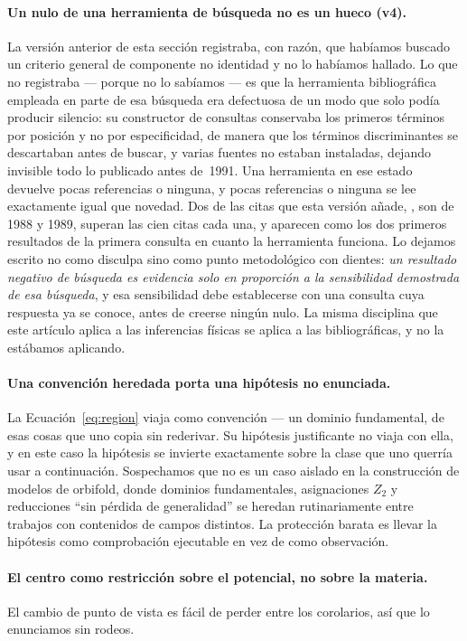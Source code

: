 \documentclass[11pt,a4paper]{article}
\begin{document}
\paragraph{Un nulo de una herramienta de búsqueda no es un hueco (v4).} La versión anterior de
esta sección registraba, con razón, que habíamos buscado un criterio general de componente
no identidad y no lo habíamos hallado. Lo que no registraba --- porque no lo sabíamos --- es que la
herramienta bibliográfica empleada en parte de esa búsqueda era defectuosa de un modo que solo
podía producir silencio: su constructor de consultas conservaba los primeros términos por
posición y no por especificidad, de manera que los términos discriminantes se descartaban antes
de buscar, y varias fuentes no estaban instaladas, dejando invisible todo lo publicado antes
de~1991. Una herramienta en ese estado devuelve pocas referencias o ninguna, y pocas referencias
o ninguna se lee exactamente igual que novedad. Dos de las citas que esta versión añade,
\cite{DaviesMcLachlan1,DaviesMcLachlan2}, son de 1988 y 1989, superan las cien citas cada una, y
aparecen como los dos primeros resultados de la primera consulta en cuanto la herramienta
funciona. Lo dejamos escrito no como disculpa sino como punto metodológico con dientes:
\emph{un resultado negativo de búsqueda es evidencia solo en proporción a la sensibilidad
demostrada de esa búsqueda}, y esa sensibilidad debe establecerse con una consulta cuya
respuesta ya se conoce, antes de creerse ningún nulo. La misma disciplina que este artículo
aplica a las inferencias físicas se aplica a las bibliográficas, y no la estábamos aplicando.

\paragraph{Una convención heredada porta una hipótesis no enunciada.} La
Ecuación~\eqref{eq:region} viaja como convención --- un dominio fundamental, de esas cosas que
uno copia sin rederivar. Su hipótesis justificante no viaja con ella, y en este caso la
hipótesis se invierte exactamente sobre la clase que uno querría usar a continuación.
Sospechamos que no es un caso aislado en la construcción de modelos de orbifold, donde
dominios fundamentales, asignaciones $Z_2$ y reducciones ``sin pérdida de generalidad'' se
heredan rutinariamente entre trabajos con contenidos de campos distintos. La protección barata
es llevar la hipótesis como comprobación ejecutable en vez de como observación.

\paragraph{El centro como restricción sobre el potencial, no sobre la materia.} El cambio de
punto de vista es fácil de perder entre los corolarios, así que lo enunciamos sin rodeos.
\end{document}
